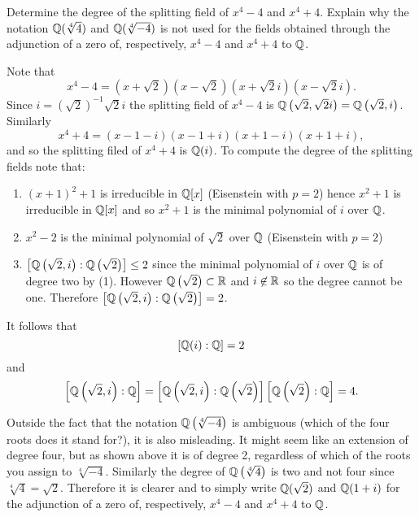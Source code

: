     \begin{ex}{21.38}
        Determine the degree of the splitting field of $x^4-4$ and $x^4+4$. Explain why the notation $\mathbb{Q}(\sqrt[4]{4})$ and $\mathbb{Q}(\sqrt[4]{-4})$  is not used for the fields obtained through the adjunction of a zero of, respectively, $x^4-4$ and $x^4+4$ to $\mathbb{Q}$.
    \end{ex}
    \begin{sol}
        Note that
        $$ x^4-4=\left(x+\sqrt{2}\right)\left(x-\sqrt{2}\right)\left(x+\sqrt{2}i\right)\left(x-\sqrt{2}i\right).$$
        Since $i=\left(\sqrt{2}\right)^{-1}\sqrt{2}i$ the splitting field of $x^4-4$ is $\mathbb{Q}\left(\sqrt{2},\sqrt{2}i\right)=\mathbb{Q}\left(\sqrt{2},i\right)$. 
        Similarly
        $$x^4+4=\left(x-1-i\right)\left(x-1+i\right)\left(x+1-i\right)\left(x+1+i\right),$$
        and so the splitting filed of $x^4+4$ is $\mathbb{Q}(i)$. To compute the degree of the splitting fields note that:
        \begin{enumerate}
            \item $(x+1)^2+1$ is irreducible in $\mathbb{Q}[x]$ (Eisenstein with $p=2$) hence $x^2+1$ is irreducible in $\mathbb{Q}[x]$ and so $x^2+1$ is the minimal polynomial of $i$ over $\mathbb{Q}$.
            \item $x^2-2$ is the minimal polynomial of $\sqrt{2}$ over $\mathbb{Q}$ (Eisenstein with $p=2$)
            \item $\left[\mathbb{Q}\left(\sqrt{2},i\right):\mathbb{Q}\left(\sqrt{2}\right)\right]\leq 2$ since the minimal polynomial of $i$ over $\mathbb{Q}$ is of degree two by (1). 
            However $\mathbb{Q}\left(\sqrt{2}\right)\subset\mathbb{R}$ and $i\not\in\mathbb{R}$ so the degree cannot be one. Therefore $\left[\mathbb{Q}\left(\sqrt{2},i\right):\mathbb{Q}\left(\sqrt{2}\right)\right]=2$.
        \end{enumerate}
        It follows that
        $$[\mathbb{Q}(i):\mathbb{Q}]=2$$
        and
        $$\left[\mathbb{Q}\left(\sqrt{2}, i\right):\mathbb{Q}\right]=\left[\mathbb{Q}\left(\sqrt{2}, i\right):\mathbb{Q}\left(\sqrt{2}\right)\right]\left[\mathbb{Q}\left(\sqrt{2}\right):\mathbb{Q}\right]=4.$$   

        Outside the fact that the notation $\mathbb{Q}\left(\sqrt[4]{-4}\right)$ is ambiguous (which of the four roots does it stand for?), it is also misleading.
        It might seem like an extension of degree four, but as shown above it is of degree 2, regardless of which of the roots you assign to $\sqrt[4]{-4}$.
        Similarly the degree of $\mathbb{Q}\left(\sqrt[4]{4}\right)$ is two and not four since $\sqrt[4]{4}=\sqrt{2}$. 
        Therefore it is clearer and to simply write $\mathbb{Q}(\sqrt{2})$ and $\mathbb{Q}(1+i)$ for the adjunction of a zero of, respectively, $x^4-4$ and $x^4+4$ to $\mathbb{Q}$.
    \end{sol}